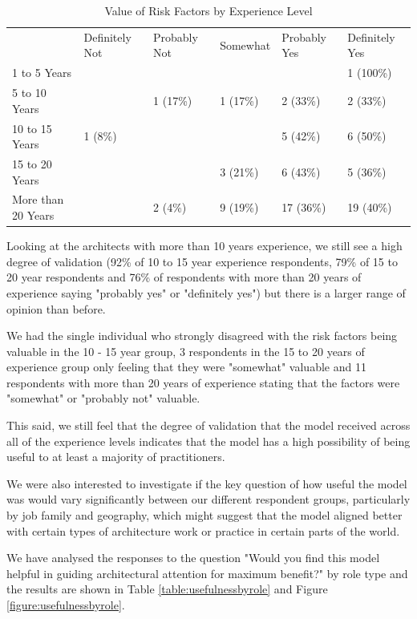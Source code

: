 \begin{table}
\caption{Value of Risk Factors by Experience Level}
\label{table:valueofriskfactors}
\footnotesize
\begin{tabular}{l p{1.5cm} p{1.5cm} p{1.5cm} p{1.5cm} p{1.5cm}}
 & Definitely Not & Probably Not & Somewhat & Probably Yes & Definitely Yes \\
1 to 5 Years       &         &          &          &           & 1 (100\%) \\
5 to 10 Years      &         & 1 (17\%) & 1 (17\%) & 2 (33\%)  & 2 (33\%) \\
10 to 15 Years     & 1 (8\%) &          &          & 5 (42\%)  & 6 (50\%) \\
15 to 20 Years     &         &          & 3 (21\%) & 6 (43\%)  & 5 (36\%) \\
More than 20 Years &         & 2 (4\%)  & 9 (19\%) & 17 (36\%) & 19 (40\%) \\
\end{tabular}
\end{table}


Looking at the architects with more than 10 years experience, we still see a high degree of validation (92\% of 10 to 15 year experience respondents, 79\% of 15 to 20 year respondents and 76\% of respondents with more than 20 years of experience saying "probably yes" or "definitely yes") but there is a larger range of opinion than before.

We had the single individual who strongly disagreed with the risk factors being valuable in the 10 - 15 year group, 3 respondents in the 15 to 20 years of experience group only feeling that they were "somewhat" valuable and 11 respondents with more than 20 years of experience stating that the factors were "somewhat" or "probably not" valuable.

This said, we still feel that the degree of validation that the model received across all of the experience levels indicates that the model has a high possibility of being useful to at least a majority of practitioners.

We were also interested to investigate if the key question of how useful the model was would vary significantly between our different respondent groups, particularly by job family and geography, which might suggest that the model aligned better with certain types of architecture work or practice in certain parts of the world.

We have analysed the responses to the question "Would you find this model helpful in guiding architectural attention for maximum benefit?" by role type and the results are shown in Table \ref{table:usefulnessbyrole} and Figure \ref{figure:usefulnessbyrole}.

